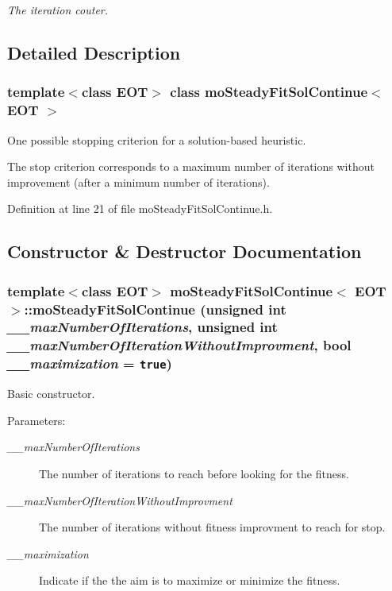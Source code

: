 \begin{CompactItemize}
\begin{CompactList}\small\item\em The iteration couter. \item\end{CompactList}\end{CompactItemize}


\subsection{Detailed Description}
\subsubsection*{template$<$class EOT$>$ class moSteadyFitSolContinue$<$ EOT $>$}

One possible stopping criterion for a solution-based heuristic. 

The stop criterion corresponds to a maximum number of iterations without improvement (after a minimum number of iterations). 



Definition at line 21 of file moSteadyFitSolContinue.h.

\subsection{Constructor \& Destructor Documentation}
\subsubsection{\setlength{\rightskip}{0pt plus 5cm}template$<$class EOT$>$ {\bf moSteadyFitSolContinue}$<$ EOT $>$::{\bf moSteadyFitSolContinue} (unsigned int {\em \_\-\_\-maxNumberOfIterations}, unsigned int {\em \_\-\_\-maxNumberOfIterationWithoutImprovment}, bool {\em \_\-\_\-maximization} = {\tt true})\hspace{0.3cm}{\tt  [inline]}}\label{classmo_steady_fit_sol_continue_bde46266638f645d409cf1afb7190c19}


Basic constructor. 

\begin{Desc}
\item[Parameters:]
\begin{description}
\item[{\em \_\-\_\-maxNumberOfIterations}]The number of iterations to reach before looking for the fitness. \item[{\em \_\-\_\-maxNumberOfIterationWithoutImprovment}]The number of iterations without fitness improvment to reach for stop. \item[{\em \_\-\_\-maximization}]Indicate if the the aim is to maximize or minimize the fitness. \end{description}
\end{Desc}


